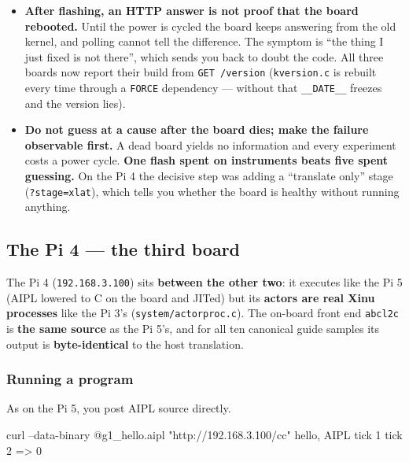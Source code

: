\documentclass[11pt,a4paper]{article}
\begin{document}
\begin{itemize}
  Make the peer log when it sends, and keep two separate counts on the board:
  how many answers arrived, and how many were still being waited for. Misreading
  this cost a round trip before the real cause (the receive window in
  \S\ref{sec:xinu-remote}) came out.
\item \textbf{After flashing, an HTTP answer is not proof that the board
  rebooted.} Until the power is cycled the board keeps answering from the old
  kernel, and polling cannot tell the difference. The symptom is ``the thing I
  just fixed is not there'', which sends you back to doubt the code. All three
  boards now report their build from \texttt{GET /version} (\texttt{kversion.c}
  is rebuilt every time through a \texttt{FORCE} dependency --- without that
  \verb|__DATE__| freezes and the version lies).
\item \textbf{Do not guess at a cause after the board dies; make the failure
  observable first.} A dead board yields no information and every experiment
  costs a power cycle. \textbf{One flash spent on instruments beats five spent
  guessing.} On the Pi 4 the decisive step was adding a ``translate only''
  stage (\texttt{?stage=xlat}), which tells you whether the board is healthy
  without running anything.
\end{itemize}

\subsection{The Pi 4 --- the third board}
\label{sec:xinu-pi4}

The Pi 4 (\texttt{192.168.3.100}) sits \textbf{between the other two}: it
executes like the Pi 5 (AIPL lowered to C on the board and JITed) but its
\textbf{actors are real Xinu processes} like the Pi 3's
(\texttt{system/actorproc.c}). The on-board front end \texttt{abcl2c} is
\textbf{the same source} as the Pi 5's, and for all ten canonical guide samples
its output is \textbf{byte-identical} to the host translation.

\subsubsection*{Running a program}

As on the Pi 5, you post AIPL source directly.

\begin{term}
curl --data-binary @g1_hello.aipl "http://192.168.3.100/cc"
hello, AIPL
tick 1
tick 2
=> 0
\end{term}
\end{document}
